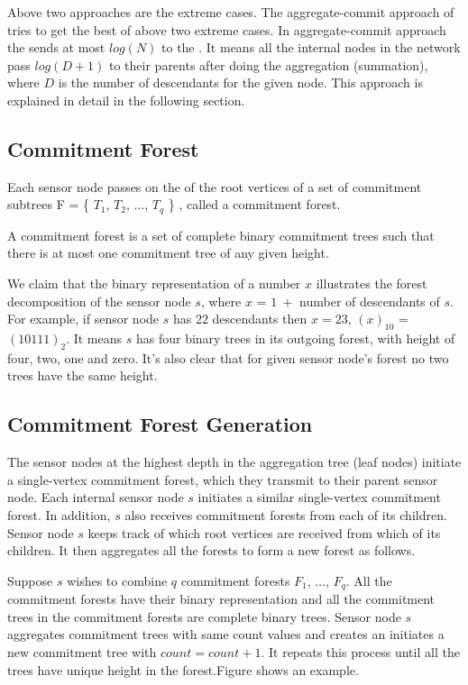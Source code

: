 		Above two approaches are the extreme cases. The aggregate-commit approach of \cite{chan2006secure} tries to get the best of above two extreme cases.
		In aggregate-commit approach the \bs sends at most $log(N)$ \payloads to the \q. 
		It means all the internal nodes in the network pass $log(D + 1)$ \payloads to their parents after doing the aggregation (summation), where $D$ is the number of descendants for the given node. 
		This approach is explained in detail in the following section.     


	\subsection{Commitment Forest}
		Each sensor node passes on the \payloads of the root vertices of a set of commitment subtrees F = \{ $T_{1}$, $T_{2}$, $\dotsc$, $T_{q}$ \} , called  a commitment forest.

		\begin{definition}\cite{chan2006secure}
		A commitment forest is a set of complete binary commitment trees such that there is at most one commitment tree of any given height.
		\end{definition}

		We claim that the binary representation of a number $x$ illustrates the forest decomposition of the sensor node $s$, where $x$ = $1\ +$ number of descendants of $s$.
		For example, if sensor node $s$ has $22$ descendants then $x =23$, $(x)_{10}$ = $(10111)_{2}$. 
		It means $s$ has four binary trees in its outgoing forest, with height of four, two, one and zero. It's also clear that for given sensor node's forest no two trees have the same height.

	\subsection{Commitment Forest Generation}
		The sensor nodes at the highest depth in the aggregation tree (leaf nodes) initiate a single-vertex commitment forest, which they transmit to their parent sensor node.
		Each internal sensor node $s$ initiates a similar single-vertex commitment forest.
		In addition, $s$ also receives commitment forests from each of its children.
		Sensor node $s$ keeps track of which root vertices are received from which of its children.
		It then aggregates all the forests to form a new forest as follows.
		
		Suppose $s$ wishes to combine $q$ commitment forests $F_{1}$, $\dotsc$, $F_{q}$.
		All the commitment forests have their binary representation and all the commitment trees in the commitment forests are complete binary trees. 
		Sensor node $s$ aggregates commitment trees with same count values and creates an initiates a new commitment tree with $count = count + 1$. It repeats this process until all the trees have unique height in the forest.Figure shows an example.


